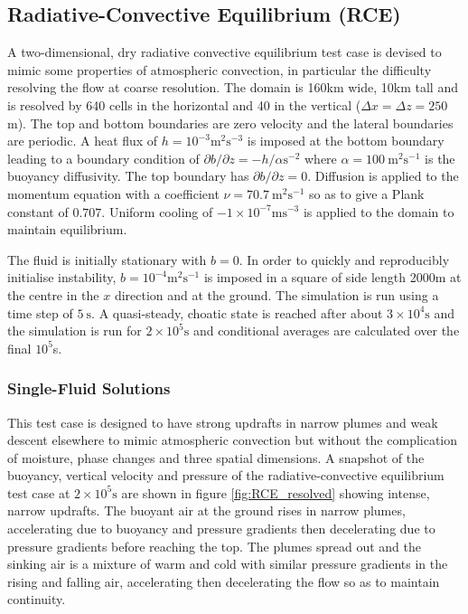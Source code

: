 \documentclass[draft]{agujournal2019}
\begin{document}

\subsection{Radiative-Convective Equilibrium (RCE)}

A two-dimensional, dry radiative convective equilibrium test case
is devised to mimic some properties of atmospheric convection, in
particular the difficulty resolving the flow at coarse resolution.
The domain is 160km wide, 10km tall and is resolved by 640 cells in
the horizontal and 40 in the vertical ($\Delta x=\Delta z=250$m).
The top and bottom boundaries are zero velocity and the lateral boundaries
are periodic. A heat flux of $h=10^{-3}\text{m}^{2}\text{s}^{-3}$
is imposed at the bottom boundary leading to a boundary condition
of $\partial b/\partial z=-h/\alpha\text{s}^{-2}$ where $\alpha=100\ \text{m}^{2}\text{s}^{-1}$
is the buoyancy diffusivity. The top boundary has $\partial b/\partial z=0$.
Diffusion is applied to the momentum equation with a coefficient $\nu=70.7\ \text{m}^{2}\text{s}^{-1}$
so as to give a Plank constant of $0.707$. Uniform cooling of $-1\times10^{-7}\text{m}\text{s}^{-3}$
is applied to the domain to maintain equilibrium.

The fluid is initially stationary with $b=0$. In order to quickly
and reproducibly initialise instability, $b=10^{-4}\text{m}^{2}\text{s}^{-1}$
is imposed in a square of side length 2000m at the centre in the $x$
direction and at the ground. The simulation is run using a time step
of $5\ \text{s}$. A quasi-steady, choatic state is reached after
about $3\times10^{4}\text{s}$ and the simulation is run for $2\times10^{5}\text{s}$
and conditional averages are calculated over the final $10^{5}$s.

\subsubsection{Single-Fluid Solutions}

This test case is designed to have strong updrafts in narrow plumes
and weak descent elsewhere to mimic atmospheric convection but without
the complication of moisture, phase changes and three spatial dimensions.
A snapshot of the buoyancy, vertical velocity and pressure of the
radiative-convective equilibrium test case at $2\times10^{5}\text{s}$
are shown in figure \ref{fig:RCE_resolved} showing intense, narrow
updrafts. The buoyant air at the ground rises in narrow plumes,
accelerating due to buoyancy and pressure gradients then decelerating
due to pressure gradients before reaching the top. The plumes spread
out and the sinking air is a mixture of warm and cold with similar
pressure gradients in the rising and falling air, accelerating then
decelerating the flow so as to maintain continuity. 
\end{document}
